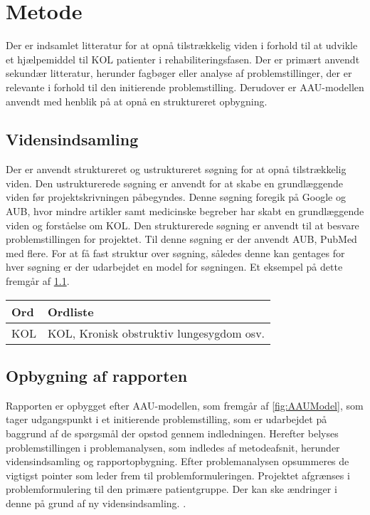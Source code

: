 \chapter{Metode}
Der er indsamlet litteratur for at opnå tilstrækkelig viden i forhold til at udvikle et hjælpemiddel til KOL patienter i rehabiliteringsfasen. Der er primært anvendt sekundær litteratur, herunder fagbøger eller analyse af problemstillinger, der er relevante i forhold til den initierende problemstilling. Derudover er AAU-modellen anvendt med henblik på at opnå en struktureret opbygning. 

\section{Vidensindsamling}
Der er anvendt struktureret og ustruktureret søgning for at opnå tilstrækkelig viden. Den ustrukturerede søgning er anvendt for at skabe en grundlæggende viden før projektskrivningen påbegyndes. Denne søgning foregik på Google og AUB, hvor mindre artikler samt medicinske begreber har skabt en grundlæggende viden og forståelse om KOL. Den strukturerede søgning er anvendt til at besvare problemstillingen for projektet. Til denne søgning er der anvendt AUB, PubMed med flere. For at få fast struktur over søgning, således denne kan gentages for hver søgning er der udarbejdet en model for søgningen. Et eksempel på dette fremgår af \ref{tab:viden}. 

\begin{table}[H]
\centering
\label{tab:viden}
\begin{tabular}{|l|l|}
\hline
Ord & Ordliste                                 \\ \hline
KOL & KOL, Kronisk obstruktiv lungesygdom osv. \\ \hline
\end{tabular}
\end{table}

\section{Opbygning af rapporten}
Rapporten er opbygget efter AAU-modellen, som fremgår af \ref{fig:AAUModel}, som tager udgangspunkt i et initierende problemstilling, som er udarbejdet på baggrund af de spørgsmål der opstod gennem indledningen. Herefter belyses problemstillingen i problemanalysen, som indledes af metodeafsnit, herunder vidensindsamling og rapportopbygning. Efter problemanalysen opsummeres de vigtigst pointer som leder frem til problemformuleringen. Projektet afgrænses i problemformulering til den primære patientgruppe. Der kan ske ændringer i denne på grund af ny vidensindsamling. .

